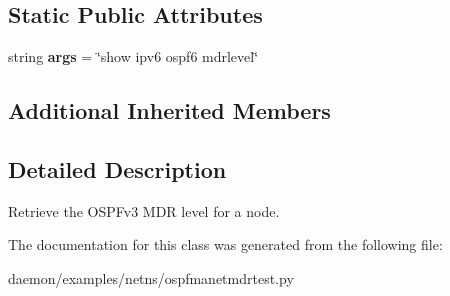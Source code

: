 \subsection*{Static Public Attributes}
\begin{DoxyCompactItemize}
\item 
\hypertarget{classospfmanetmdrtest_1_1_ospf6_mdr_level_a0f951c6421a1c72c2d8e31dce160190c}{string {\bfseries args} = \char`\"{}show ipv6 ospf6 mdrlevel\char`\"{}}\label{classospfmanetmdrtest_1_1_ospf6_mdr_level_a0f951c6421a1c72c2d8e31dce160190c}

\end{DoxyCompactItemize}
\subsection*{Additional Inherited Members}


\subsection{Detailed Description}
\begin{DoxyVerb}Retrieve the OSPFv3 MDR level for a node. \end{DoxyVerb}
 

The documentation for this class was generated from the following file\+:\begin{DoxyCompactItemize}
\item 
daemon/examples/netns/ospfmanetmdrtest.\+py\end{DoxyCompactItemize}
